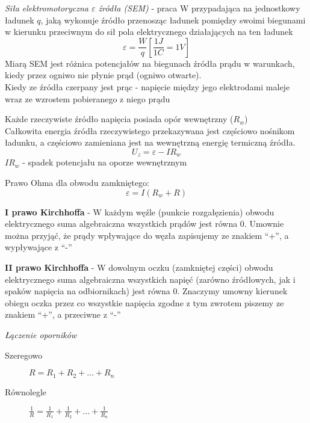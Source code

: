 \documentclass[a4paper,11pt]{article}
\begin{document}
\emph{Siła elektromotoryczna $\varepsilon$ źródła (SEM)} - praca W przypadająca na jednostkowy ładunek $q$, jaką wykonuje źródło przenosząc ładunek pomiędzy swoimi biegunami w kierunku przeciwnym do sił pola elektrycznego działających na ten ładunek
$$\varepsilon=\frac{W}{q}\left[\frac{1J}{1C}=1V\right]$$
Miarą SEM jest różnica potencjałów na biegunach źródła prądu w warunkach, kiedy przez ogniwo nie płynie prąd (ogniwo otwarte).\\
Kiedy ze źródła czerpany jest prąc - napięcie między jego elektrodami maleje wraz ze wzrostem pobieranego z niego prądu

Każde rzeczywiste źródło napięcia posiada opór wewnętrzny ($R_w$)\\
Całkowita energia źródła rzeczywistego przekazywana jest częściowo nośnikom ładunku, a częściowo zamieniana jest na wewnętrzną energię termiczną źródła.
$$U_z = \varepsilon - IR_w$$
$IR_w$ - spadek potencjału na oporze wewnętrznym

Prawo Ohma dla obwodu zamkniętego:
$$\varepsilon = I(R_w + R)$$

\textbf{I prawo Kirchhoffa} - W każdym węźle (punkcie rozgałęzienia) obwodu elektrycznego suma algebraiczna wszystkich prądów jest równa 0. Umownie można przyjąć, że prądy wpływające do węzła zapisujemy ze znakiem ``+'', a wypływające z ``-''

\textbf{II prawo Kirchhoffa} - W dowolnym oczku (zamkniętej części) obwodu elektrycznego suma algebraiczna wszystkich napięć (zarówno źródłowych, jak i spaków napięcia na odbiornikach) jest równa 0. Znaczymy umowny kierunek obiegu oczka przez co wszystkie napięcia zgodne z tym zwrotem piszemy ze znakiem ``+'', a przeciwne z ``-''

\emph{Łączenie oporników}
\begin{description}
\item[Szeregowo] $R=R_1+R_2+...+R_n$
\item[Równolegle] $\frac{1}{R} = \frac{1}{R_1} + \frac{1}{R_2} + ... + \frac{1}{R_n}$
\end{description}
\end{document}
